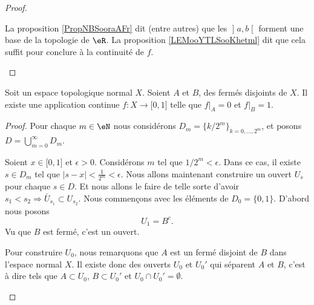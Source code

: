 \begin{proof}
\begin{subproof}
        La proposition \ref{PropNBSooraAFr} dit (entre autres) que les \( \mathopen] a , b \mathclose[\) forment une base de la topologie de \( \eR\). La proposition \ref{LEMooYTLSooKhetml} dit que cela suffit pour conclure à la continuité de \( f\).
    \end{subproof}
\end{proof}


\begin{theorem}     \label{THOooKYYEooLFcNpg}
    Soit un espace topologique normal \( X\). Soient \( A\) et \( B\), des fermés disjoints de \( X\). Il existe une application continue \( f\colon X\to \mathopen[ 0 , 1 \mathclose]\) telle que \( f|_A=0\) et \( f|_B=1\).
\end{theorem}

\begin{proof}
    Pour chaque \( m\in \eN\) nous considérons \( D_m=\{ k/2^m \}_{k=0,\ldots, 2^m}\), et posons \( D=\bigcup_{m=0}^{\infty}D_m\).
    \begin{subproof}
        Soient \( x\in\mathopen[ 0 , 1 \mathclose]\) et \( \epsilon>0\). Considérons \( m\) tel que \( 1/2^m<\epsilon\). Dans ce cas, il existe \( s\in D_m\) tel que \( | s-x |<\frac{1}{ 2^m }<\epsilon\).
        Nous allons maintenant construire un ouvert \( U_s\) pour chaque \( s\in D\). Et nous allons le faire de telle sorte d'avoir \( s_1<s_2\Rightarrow \bar U_{s_1}\subset U_{s_2}\).
        \spitem[Pour \( s\in D_0\)]
        Nous commençons avec les éléments de \( D_0=\{ 0,1 \}\). D'abord nous posons 
        \begin{equation}
            U_1=B^c.
        \end{equation}
    Vu que \( B\) est fermé, c'est un ouvert. 

    Pour construire \( U_0\), nous remarquons que \( A\) est un fermé disjoint de \( B\) dans l'espace normal \( X\). Il existe donc des ouverts \( U_0\) et \( U_0'\) qui séparent \( A\) et \( B\), c'est à dire tels que \( A\subset U_0\), \( B\subset U_0'\) et \( U_0\cap U_0'=\emptyset\).


\end{subproof}
\end{proof}

